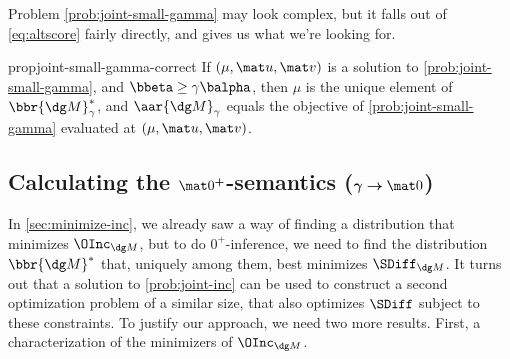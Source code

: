 Problem \eqref{prob:joint-small-gamma} may look complex, but it falls
out of \eqref{eq:altscore} fairly directly, and gives us what we're
looking for.

\begin{linked}{prop}{joint-small-gamma-correct}
    If $(\mu, \mat u, \mat v)$ is a solution to \eqref{prob:joint-small-gamma},
    and $\bbeta \ge \gamma \balpha$,
    then
    $\mu$ is the unique element of
    $\bbr{\dg M}^*_\gamma$, and $\aar{\dg M}_\gamma$
    equals the objective of \eqref{prob:joint-small-gamma} evaluated at $(\mu, \mat u, \mat v)$.
\end{linked}

\subsection{
    Calculating the \texorpdfstring{$\mat 0^{\boldsymbol+}$\!}{0+}-semantics
    (\texorpdfstring{$\boldsymbol\gamma\boldsymbol\to\mat 0$}{gamma->0})}
    \label{sec:empirical-limit}
%
In \cref{sec:minimize-inc}, we
already saw a way of finding a distribution that minimizes $\OInc_{\dg M}$,
but to do
$0^+$-inference,
we need to find the distribution $\bbr{\dg M}^*$ that, uniquely among them, best minimizes $\SDiff_{\dg M}$.
It turns out that a solution to \eqref{prob:joint-inc} can be used to construct a second optimization problem of a similar size, that also optimizes $\SDiff$ subject to these constraints.
To justify our approach, we need two more results.
First, a characterization of the minimizers of $\OInc_{\dg M}$.

